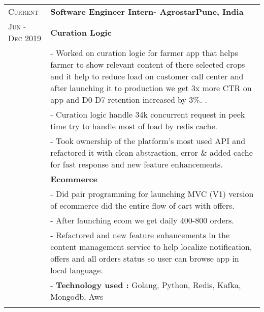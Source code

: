 \documentclass[a4paper,10pt]{extarticle} %
\begin{document}
\begin{tabularx}{\linewidth}{ l | X }

\textsc{Current} & \textbf{Software Engineer Intern- Agrostar}\hfill\textbf{Pune, India}\\
\textsc{Jun - Dec 2019}
& \textbf{Curation Logic}\\
& {- Worked on curation logic for farmer app that helps farmer to show relevant content of there selected crops and it help to reduce load on customer call center and after launching it to production we get 3x more CTR on app and D0-D7 retention increased by 3\%.
.}\\
& {- Curation logic handle 34k concurrent request in peek time try to handle most of  load by redis cache.}\\
& {- Took ownership of the platform's most used API and refactored it with clean abstraction, error \& added cache for fast response and new feature enhancements.}\\

& \textbf{Ecommerce}\\
& {- Did pair programming for launching MVC (V1) version of ecommerce did the entire flow of cart with offers.}\\
& {- After launching ecom we get daily 400-800 orders.}\\
&{- Refactored and new feature enhancements in the content management service to help localize notification, offers and all orders status so user can browse app in local language.}\\
&{- \textbf{Technology used :} Golang, Python, Redis, Kafka, Mongodb, Aws}\\
\multicolumn{2}{c}{} \\

\end{tabularx}


\end{document}

